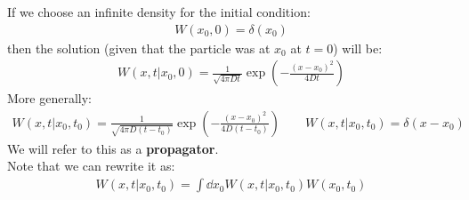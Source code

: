 \documentclass[../template.tex]{subfiles}
\begin{document}
If we choose an infinite density for the initial condition:
\begin{align*}
    W(x_0, 0) = \delta(x_0)
\end{align*}
then the solution (given that the particle was at $x_0$ at $t=0$) will be:
\begin{align*}
    W(x,t | x_0, 0) = \frac{1}{\sqrt{4 \pi D t}} \exp \left(-\frac{(x-x_0)^2}{4 D t} \right) 
\end{align*}
More generally:
\begin{align*}
    W(x,t | x_0, t_0 ) = \frac{1}{\sqrt{4 \pi D (t-t_0 )}} \exp \left(-\frac{(x-x_0 )^2}{4 D (t-t_0)} \right) \qquad W(x,t|x_0, t_0 ) = \delta(x- x_0)
\end{align*}
We will refer to this as a \textbf{propagator}.\\
Note that we can rewrite it as:
\begin{align*}
    W(x,t|x_0, t_0 ) = \int \dd{x_0 } W(x,t|x_0, t_0) W(x_0, t_0)
\end{align*} 
\end{document}

